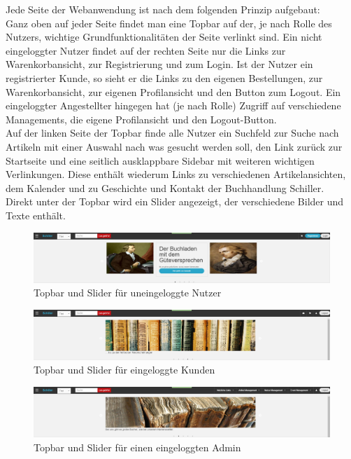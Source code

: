 \documentclass[a4paper]{article}
\begin{document}
Jede Seite der Webanwendung ist nach dem folgenden Prinzip aufgebaut: \\
Ganz oben auf jeder Seite findet man eine Topbar auf der, je nach Rolle des Nutzers, wichtige Grundfunktionalitäten der Seite verlinkt sind. Ein nicht eingeloggter Nutzer findet auf der rechten Seite nur die Links zur Warenkorbansicht, zur Registrierung und zum Login. Ist der Nutzer ein registrierter Kunde, so sieht er die Links zu den eigenen Bestellungen, zur Warenkorbansicht, zur eigenen Profilansicht und den Button zum Logout. Ein eingeloggter Angestellter hingegen hat (je nach Rolle) Zugriff auf verschiedene Managements, die eigene Profilansicht und den Logout-Button. \\
Auf der linken Seite der Topbar finde alle Nutzer ein Suchfeld zur Suche nach Artikeln mit einer Auswahl nach was gesucht werden soll, den Link zurück zur Startseite und eine seitlich ausklappbare Sidebar mit weiteren wichtigen Verlinkungen. Diese enthält wiederum Links zu verschiedenen Artikelansichten, dem Kalender und zu Geschichte und Kontakt der Buchhandlung Schiller. \\
Direkt unter der Topbar wird ein Slider angezeigt, der verschiedene Bilder und Texte enthält. \\

\begin{figure}[ht]
\centering
\includegraphics[width=1.0\textwidth]{Topbar1.jpg}
\caption{Topbar und Slider für uneingeloggte Nutzer}	
\end{figure}
\smallskip

\begin{figure}[ht]
\centering
\includegraphics[width=1.0\textwidth]{Topbar2.jpg}
\caption{Topbar und Slider für eingeloggte Kunden}
\end{figure}
\smallskip

\begin{figure}[ht]
\centering
\includegraphics[width=1.0\textwidth]{Topbar3.jpg}
\caption{Topbar und Slider für einen eingeloggten Admin}
\end{figure}
\smallskip
\end{document}

